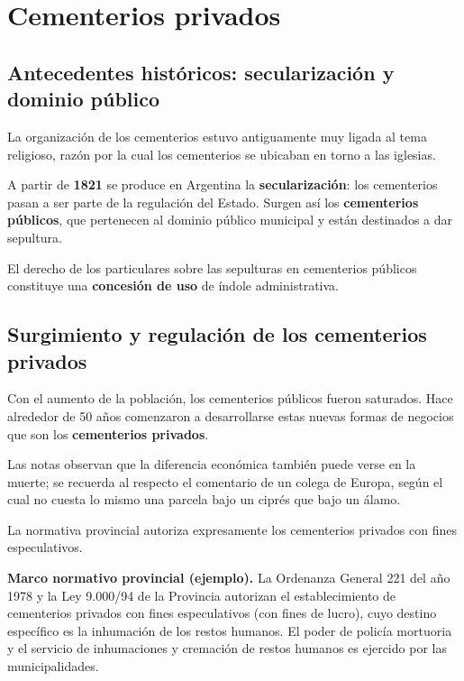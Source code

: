 \documentclass[12pt,oneside]{book}
\begin{document}
\chapter{Cementerios privados}

\section{Antecedentes históricos: secularización y dominio público}

La organización de los cementerios estuvo antiguamente muy ligada al tema religioso, razón por la cual los cementerios se ubicaban en torno a las iglesias.

A partir de \textbf{1821} se produce en Argentina la \textbf{secularización}: los cementerios pasan a ser parte de la regulación del Estado. Surgen así los \textbf{cementerios públicos}, que pertenecen al dominio público municipal y están destinados a dar sepultura.

El derecho de los particulares sobre las sepulturas en cementerios públicos constituye una \textbf{concesión de uso} de índole administrativa.

\section{Surgimiento y regulación de los cementerios privados}

Con el aumento de la población, los cementerios públicos fueron saturados. Hace alrededor de 50 años comenzaron a desarrollarse estas nuevas formas de negocios que son los \textbf{cementerios privados}.

Las notas observan que la diferencia económica también puede verse en la muerte; se recuerda al respecto el comentario de un colega de Europa, según el cual no cuesta lo mismo una parcela bajo un ciprés que bajo un álamo.

La normativa provincial autoriza expresamente los cementerios privados con fines especulativos.

\begin{note}
\textbf{Marco normativo provincial (ejemplo).} La Ordenanza General 221 del año 1978 y la Ley 9.000/94 de la Provincia autorizan el establecimiento de cementerios privados con fines especulativos (con fines de lucro), cuyo destino específico es la inhumación de los restos humanos. El poder de policía mortuoria y el servicio de inhumaciones y cremación de restos humanos es ejercido por las municipalidades.
\end{note}
\end{document}
